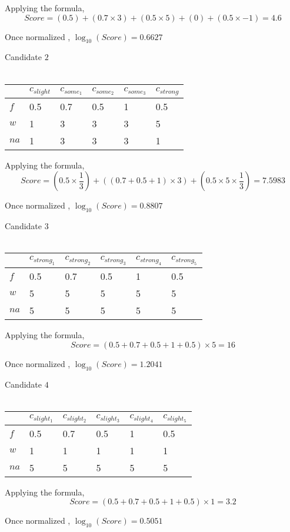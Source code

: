 \documentclass[11pt]{article}
\begin{document}
\begin{large}
Applying the formula, \\
$$Score = (0.5) + (0.7 \times 3) + (0.5 \times 5) + (0) + (0.5 \times -1) = 4.6 $$

Once normalized , $\log_{10}(Score) = 0.6627 $

Candidate $2$ \\ \\
\begin{tabular}{|l|l|l|l|l|l|}
\hline
  & $c_{slight}$  & $c_{some_{1}}$  & $c_{some_{2}}$  & $c_{some_{3}}$ & $c_{strong}$  \\ \hline
$f$ & 0.5 & 0.7 & 0.5 & 1  & 0.5 \\ \hline
$w$ & 1   & 3   & 3   & 3  & 5  \\ \hline
$na$ & 1  & 3  & 3  & 3 & 1  \\ \hline
\end{tabular}

Applying the formula, \\
$$Score = (0.5 \times \frac{1}{3}) + ((0.7+0.5+1) \times 3) +  (0.5 \times 5 \times \frac{1}{3}) = 7.5983 $$

Once normalized , $\log_{10}(Score) = 0.8807 $

Candidate $3$ \\ \\
\begin{tabular}{|l|l|l|l|l|l|}
\hline
  & $c_{strong_{1}}$  & $c_{strong_{2}}$  & $c_{strong_{3}}$  & $c_{strong_{4}}$ & $c_{strong_{5}}$  \\ \hline
$f$ & 0.5 & 0.7 & 0.5 & 1  & 0.5 \\ \hline
$w$ & 5   & 5   & 5   & 5  & 5  \\ \hline
$na$ & 5  & 5  & 5  & 5 & 5  \\ \hline
\end{tabular}

Applying the formula, \\
$$Score = (0.5 + 0.7 +0.5 +1 + 0.5) \times 5 = 16 $$

Once normalized , $\log_{10}(Score) = 1.2041 $

Candidate $4$ \\ \\
\begin{tabular}{|l|l|l|l|l|l|}
\hline
  & $c_{slight_{1}}$  & $c_{slight_{2}}$  & $c_{slight_{3}}$  & $c_{slight_{4}}$ & $c_{slight_{5}}$  \\ \hline
$f$ & 0.5 & 0.7 & 0.5 & 1  & 0.5 \\ \hline
$w$ & 1   & 1   & 1   & 1  & 1  \\ \hline
$na$ & 5  & 5  & 5  & 5 & 5  \\ \hline
\end{tabular}

Applying the formula, \\
$$Score = (0.5 + 0.7 +0.5 +1 + 0.5) \times 1 = 3.2 $$

Once normalized , $\log_{10}(Score) =  0.5051$ \\ \\

\end{large}
\end{document}
